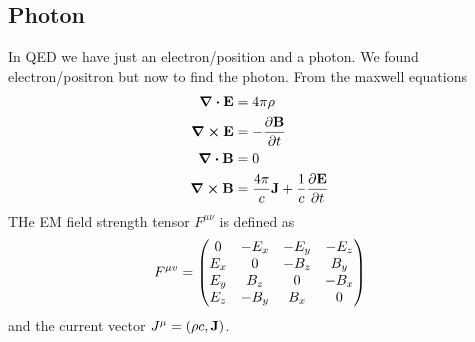 \documentclass[../main.tex]{subfiles}
\begin{document}
\subsection*{Photon}
In QED we have just an electron/position and a photon. We found electron/positron but now to find
the photon. From the maxwell equations
\begin{align*}
    \div \vb E &= 4 \pi \rho \\
    \curl \vb E &= - \pdv{\vb B}{t} \\
    \div \vb B &= 0 \\
    \curl \vb B &= \frac{4\pi}{c} \vb J + \frac{1}{c} \pdv{\vb E}{t}
\end{align*}
THe EM field strength tensor $F^{\mu \nu}$ is defined as
\begin{align*}
    F^{\mu v} = \mqty(0 & -E_x & -E_y & -E_z \\ 
                        E_x & 0 & -B_z & B_y \\
                        E_y & B_z & 0 & -B_x \\
                        E_z & -B_y & B_x & 0)
\end{align*}
and the current vector $J^\mu = (\rho c, \vb J)$.
\end{document}
